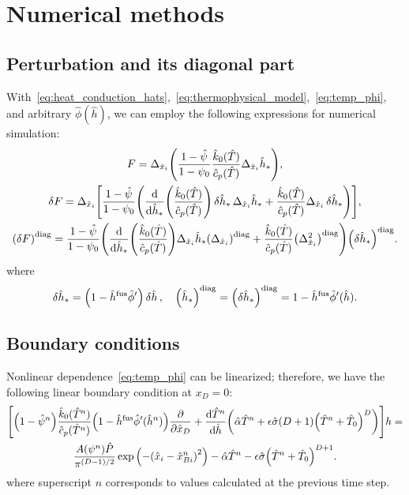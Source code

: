 \documentclass{article}
\newcommand{\dder}[2][]{\Delta_{#2}#1}
\newcommand{\diag}[1]{\qty(#1)^\mathrm{diag}}
\newcommand{\fusion}[1]{{#1}^\mathrm{fus}}
\begin{document}
\section{Numerical methods}

\subsection{Perturbation and its diagonal part}

With~\eqref{eq:heat_conduction_hats},~\eqref{eq:thermophysical_model},~\eqref{eq:temp_phi},
and arbitrary \(\hat{\phi}(\hat{h})\), we can employ the following expressions for numerical simulation:
\begin{gather}
    F = \dder{\hat{x}_i}\qty(
        \frac{1 - \hat{\psi}}{1 - \psi_0}
	    \frac{\hat{k}_0(\hat{T})}{\hat{c}_p(\hat{T})}
	    \dder[\hat{h}_*]{\hat{x}_i}
	), \\
    \var{F} = \dder{\hat{x}_i}\qty[ \frac{1 - \hat{\psi}}{1 - \psi_0} \qty(
	    \dv{\hat{h}_*}(\frac{\hat{k}_0(\hat{T})}{\hat{c}_p(\hat{T})})\var{\hat{h}_*}\dder[\hat{h}_*]{\hat{x}_i}
	    +
	    \frac{\hat{k}_0(\hat{T})}{\hat{c}_p(\hat{T})}
	    \dder[\var{\hat{h}_*}]{\hat{x}_i}
	)], \\
    \diag{\var{F}} = \frac{1 - \hat{\psi}}{1 - \psi_0} \qty(
	    \dv{\hat{h}_*}(\frac{\hat{k}_0(\hat{T})}{\hat{c}_p(\hat{T})})\dder[\hat{h}_*]{\hat{x}_i} \diag{\dder{\hat{x}_i}}
	    +
	    \frac{\hat{k}_0(\hat{T})}{\hat{c}_p(\hat{T})}
	    \diag{\dder{\hat{x}_i}^2}
	)\diag{\var{\hat{h}_*}}.
\end{gather}
where
\begin{equation}
    \var{\hat{h}_*} = \qty(1 - \fusion{\hat{h}}\hat\phi')\var{\hat{h}}, \quad
    \diag{\hat{h}_*} = \diag{\var{\hat{h}_*}} = 1 - \fusion{\hat{h}}\hat\phi'(\hat{h}).
\end{equation}

\subsection{Boundary conditions}

Nonlinear dependence~\eqref{eq:temp_phi} can be linearized; therefore, we have the following linear boundary condition at \(x_D=0\):
\begin{multline}\label{eq:bc_linearized}
	\qty[
	    \qty(1 - \hat{\psi}^n) \frac{\hat{k}_0(\hat{T}^n)}{\hat{c}_p(\hat{T}^n)}
	    \qty(1-\fusion{\hat{h}}\hat\phi'(\hat{h}^n))\pdv{\hat{x}_D} +
	    \dv{\hat{T}^n}{\hat{h}}\qty(
	        \hat{\alpha}\hat{T}^n + \epsilon\hat{\sigma}(D+1)\qty(\hat{T}^n + \hat{T}_0)^D)
	]h = \\ \frac{A(\psi^n)\hat{P}}{\pi^{(D-1)/2}}\exp\qty( -\qty(\hat{x}_i-\hat{x}_{Bi}^n)^2 ) -
        \hat{\alpha}\hat{T}^n - \epsilon\hat{\sigma}\qty(\hat{T}^n + \hat{T}_0)^{D+1}.
\end{multline}
where superscript \(n\) corresponds to values calculated at the previous time step.
\end{document}
